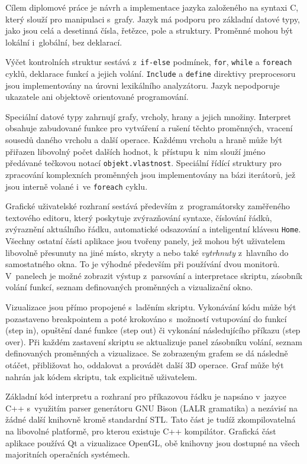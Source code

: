 \documentclass[11pt,twoside,a4paper]{book}
\begin{document}
Cílem diplomové práce je návrh a implementace jazyka založeného na syntaxi C, který slouží pro manipulaci s~grafy. Jazyk má podporu pro základní datové typy, jako jsou celá a desetinná čísla, řetězce, pole a struktury. Proměnné mohou být lokální i~globální, bez deklarací.

Výčet kontrolních struktur sestává z~\texttt{if-else} podmínek, \texttt{for}, \texttt{while} a \texttt{foreach} cyklů, deklarace funkcí a jejich volání. \texttt{Include} a \texttt{define} direktivy preprocesoru jsou implementovány na úrovni lexikálního analyzátoru. Jazyk nepodporuje ukazatele ani objektově orientované programování.

Speciální datové typy zahrnují grafy, vrcholy, hrany a jejich množiny. Interpret obsahuje zabudované funkce pro vytváření a rušení těchto proměnných, vracení sousedů daného vrcholu a další operace. Každému vrcholu a hraně může být přiřazen libovolný počet dalších hodnot, k~přístupu k~nim slouží jméno předávané tečkovou notací \texttt{objekt.vlastnost}. Speciální řídící struktury pro zpracování komplexních proměnných jsou implementovány na bázi iterátorů, jež jsou interně volané i~ve \texttt{foreach} cyklu.

Grafické uživatelské rozhraní sestává především z~programátorsky zaměřeného textového editoru, který poskytuje zvýrazňování syntaxe, číslování řádků, zvýraznění aktuálního řádku, automatické odsazování a inteligentní klávesu \texttt{Home}. Všechny ostatní části aplikace jsou tvořeny panely, jež mohou být uživatelem libovolně přesunuty na jiné místo, skryty a nebo také \textit{vytrhnuty} z~hlavního do samostatného okna. To je výhodné především při používání dvou monitorů. V~panelech je možné zobrazit výstup z~parsování a interpretace skriptu, zásobník volání funkcí, seznam definovaných proměnných a vizualizační okno.

Vizualizace jsou přímo propojené s~laděním skriptu. Vykonávání kódu může být pozastaveno breakpointem a poté krokováno s~možností vstupování do funkcí (step in), opuštění dané funkce (step out) či vykonání následujícího příkazu (step over). Při každém zastavení skriptu se aktualizuje panel zásobníku volání, seznam definovaných proměnných a vizualizace. Se zobrazeným grafem se dá následně otáčet, přibližovat ho, oddalovat a provádět další 3D operace. Graf může být nahrán jak kódem skriptu, tak explicitně uživatelem.

Základní kód interpretu a rozhraní pro příkazovou řádku je napsáno v~jazyce C++ s~využitím parser generátoru GNU Bison (LALR gramatika) a nezávisí na žádné další knihovně kromě standardní STL. Tato část je tudíž zkompilovatelná na libovolné platformě, pro kterou existuje C++ kompilátor. Grafická část aplikace používá Qt a vizualizace OpenGL, obě knihovny jsou dostupné na všech majoritních operačních systémech.
\end{document}
